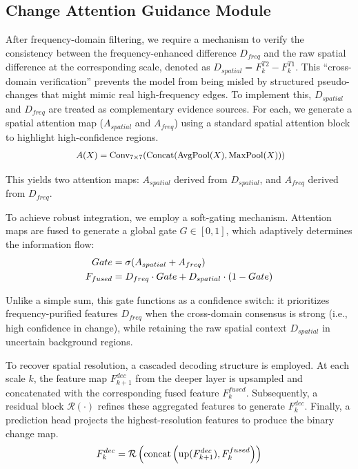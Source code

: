 \documentclass[lettersize,journal]{IEEEtran}
\begin{document}
\subsection{Change Attention Guidance Module} 

After frequency-domain filtering, we require a mechanism to verify the consistency between the frequency-enhanced difference $D_{freq}$ and the raw spatial difference at the corresponding scale, denoted as $D_{spatial} = F_{k}^{T2} - F_{k}^{T1}$. This ``cross-domain verification'' prevents the model from being misled by structured pseudo-changes that might mimic real high-frequency edges.
To implement this, $D_{spatial}$ and $D_{freq}$ are treated as complementary evidence sources. For each, we generate a spatial attention map ($A_{spatial}$ and $A_{freq}$) using a standard spatial attention block to highlight high-confidence regions.
\begin{equation}
\label{deqn_Ax}
\mbox{
\small
$A(X) = \text{Conv}_{7\times7}(\text{Concat}(\text{AvgPool}(X), \text{MaxPool}(X)))$}
\vspace{-5pt}
\end{equation}

This yields two attention maps: $A_{spatial}$ derived from $D_{spatial}$, and $A_{freq}$ derived from $D_{freq}$.

To achieve robust integration, we employ a soft-gating mechanism. Attention maps are fused to generate a global gate $G \in [0, 1]$, which adaptively determines the information flow:
\begin{align}
\label{deqn_Gate}
Gate &= \sigma(A_{spatial} + A_{freq})\\
\label{deqn_Ffused}
F_{fused} &= D_{freq} \cdot Gate + D_{spatial} \cdot (1 - Gate)
\vspace{-5pt}
\end{align}

Unlike a simple sum, this gate functions as a confidence switch: it prioritizes frequency-purified features $D_{freq}$ when the cross-domain consensus is strong (i.e., high confidence in change), while retaining the raw spatial context $D_{spatial}$ in uncertain background regions.

To recover spatial resolution, a cascaded decoding structure is employed. At each scale $k$, the feature map $F_{k+1}^{dec}$ from the deeper layer is upsampled and concatenated with the corresponding fused feature $F_{k}^{fused}$. Subsequently, a residual block $\mathcal{R}(\cdot)$ refines these aggregated features to generate $F_{k}^{dec}$. Finally, a prediction head projects the highest-resolution features to produce the binary change map.
\begin{equation}
\label{deqn_Fidec}
F_{k}^{dec} = \mathcal{R} \left( \mathrm{concat} \left( \mathrm{up}(F_{k+1}^{dec}), F_{k}^{fused} \right) \right)
\vspace{-5pt}
\end{equation}
\end{document}
